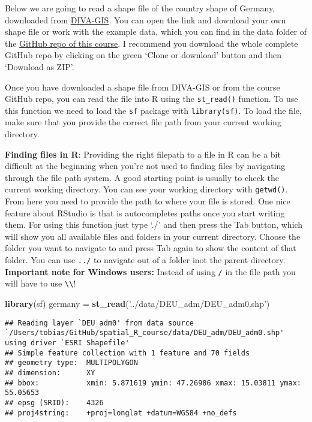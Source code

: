 \documentclass[]{article}
\newenvironment{Shaded}{\begin{snugshade}}{\end{snugshade}}
\newcommand{\KeywordTok}[1]{\textcolor[rgb]{0.13,0.29,0.53}{\textbf{#1}}}
\newcommand{\NormalTok}[1]{#1}
\newcommand{\StringTok}[1]{\textcolor[rgb]{0.31,0.60,0.02}{#1}}
\begin{document}
Below we are going to read a shape file of the country shape of Germany,
downloaded from \href{http://www.diva-gis.org/gdata}{DIVA-GIS}. You can
open the link and download your own shape file or work with the example
data, which you can find in the data folder of the
\href{https://github.com/tobiashofmann88/spatial_R_course}{GitHub repo
of this course}. I recommend you download the whole complete GitHub repo
by clicking on the green `Clone or download' button and then `Download
as ZIP'.

Once you have downloaded a shape file from DIVA-GIS or from the course
GitHub repo, you can read the file into R using the \texttt{st\_read()}
function. To use this function we need to load the \texttt{sf} package
with \texttt{library(sf)}. To load the file, make sure that you provide
the correct file path from your current working directory.

\textbf{Finding files in R}: Providing the right filepath to a file in R
can be a bit difficult at the beginning when you're not used to finding
files by navigating through the file path system. A good starting point
is usually to check the current working directory. You can see your
working directory with \texttt{getwd()}. From here you need to provide
the path to where your file is stored. One nice feature about RStudio is
that is autocompletes paths once you start writing them. For using this
function just type `./' and then press the Tab button, which will show
you all available files and folders in your current directory. Choose
the folder you want to navigate to and press Tab again to show the
content of that folder. You can use \texttt{../} to navigate out of a
folder inot the parent directory. \textbf{Important note for Windows
users:} Instead of using \texttt{/} in the file path you will have to
use \texttt{\textbackslash{}\textbackslash{}}!

\begin{Shaded}
\begin{Highlighting}[]
\KeywordTok{library}\NormalTok{(sf)}
\NormalTok{germany =}\StringTok{ }\KeywordTok{st_read}\NormalTok{(}\StringTok{'../data/DEU_adm/DEU_adm0.shp'}\NormalTok{)}
\end{Highlighting}
\end{Shaded}

\begin{verbatim}
## Reading layer `DEU_adm0' from data source `/Users/tobias/GitHub/spatial_R_course/data/DEU_adm/DEU_adm0.shp' using driver `ESRI Shapefile'
## Simple feature collection with 1 feature and 70 fields
## geometry type:  MULTIPOLYGON
## dimension:      XY
## bbox:           xmin: 5.871619 ymin: 47.26986 xmax: 15.03811 ymax: 55.05653
## epsg (SRID):    4326
## proj4string:    +proj=longlat +datum=WGS84 +no_defs
\end{verbatim}
\end{document}

